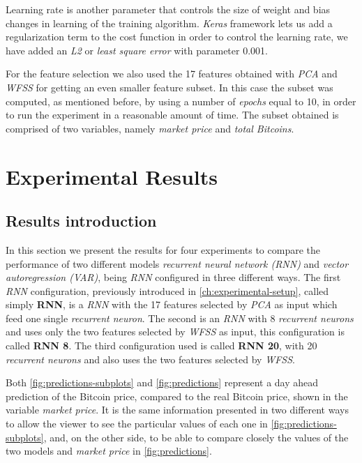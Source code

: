 Learning rate is another parameter that controls the size of weight
and bias changes in learning of the training algorithm. \textit{Keras}
framework lets us add a regularization term to the cost function in
order to control the learning rate, we have added an \textit{L2} or
\textit{least square error} with parameter 0.001.


For the feature selection we also used the 17 features obtained with
\textit{PCA} and \textit{WFSS} for getting an even smaller feature
subset. In this case the subset was computed, as mentioned before, by
using a number of \textit{epochs} equal to 10, in order to run the
experiment in a reasonable amount of time. The subset obtained is
comprised of two variables, namely \textit{market price} and
\textit{total Bitcoins}.

\chapter{Experimental Results}
\label{ch:experimental-results}

\section{Results introduction}
\label{sec:result-presentation}


In this section we present the results for four experiments to compare
the performance of two different models \textit{recurrent neural
network (RNN)} and \textit{vector autoregression (VAR)}, being
\textit{RNN} configured in three different ways. The first
\textit{RNN} configuration, previously introduced in
\autoref{ch:experimental-setup}, called simply \textbf{RNN}, is a
\textit{RNN} with the 17 features selected by \textit{PCA} as input
which feed one single \textit{recurrent neuron}. The second is an
\textit{RNN} with 8 \textit{recurrent neurons} and uses only the two
features selected by \textit{WFSS} as input, this configuration is
called \textbf{RNN 8}. The third configuration used is called
\textbf{RNN 20}, with 20 \textit{recurrent neurons} and also uses the
two features selected by \textit{WFSS}.

Both \autoref{fig:predictions-subplots} and \autoref{fig:predictions}
represent a day ahead prediction of the Bitcoin price, compared to the
real Bitcoin price, shown in the variable \textit{market price}. It is
the same information presented in two different ways to allow the
viewer to see the particular values of each one in
\autoref{fig:predictions-subplots}, and, on the other side, to be able
to compare closely the values of the two models and \textit{market
price} in \autoref{fig:predictions}.

